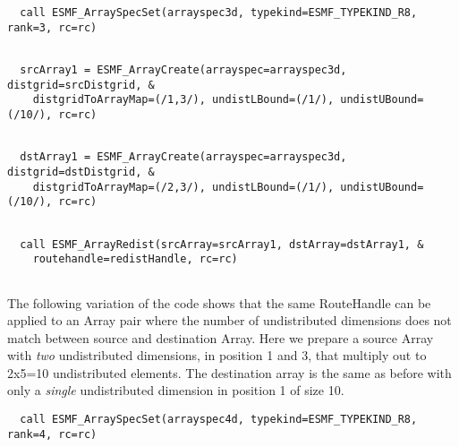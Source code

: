  \begin{verbatim}
  call ESMF_ArraySpecSet(arrayspec3d, typekind=ESMF_TYPEKIND_R8, rank=3, rc=rc)
 
\end{verbatim}
 

 \begin{verbatim}
  srcArray1 = ESMF_ArrayCreate(arrayspec=arrayspec3d, distgrid=srcDistgrid, &
    distgridToArrayMap=(/1,3/), undistLBound=(/1/), undistUBound=(/10/), rc=rc)
 
\end{verbatim}
 

 \begin{verbatim}
  dstArray1 = ESMF_ArrayCreate(arrayspec=arrayspec3d, distgrid=dstDistgrid, &
    distgridToArrayMap=(/2,3/), undistLBound=(/1/), undistUBound=(/10/), rc=rc)
 
\end{verbatim}
 

  

 \begin{verbatim}
  call ESMF_ArrayRedist(srcArray=srcArray1, dstArray=dstArray1, &
    routehandle=redistHandle, rc=rc)
 
\end{verbatim}
 

   The following variation of the code shows that the same RouteHandle can be
   applied to an Array pair where the number of undistributed dimensions does
   not match between source and destination Array. Here we prepare a source
   Array with {\em two} undistributed dimensions, in position 1 and 3, that 
   multiply out to 2x5=10 undistributed elements. The destination array is the
   same as before with only a {\em single} undistributed dimension in position 1
   of size 10. 

 \begin{verbatim}
  call ESMF_ArraySpecSet(arrayspec4d, typekind=ESMF_TYPEKIND_R8, rank=4, rc=rc)
 
\end{verbatim}
 
